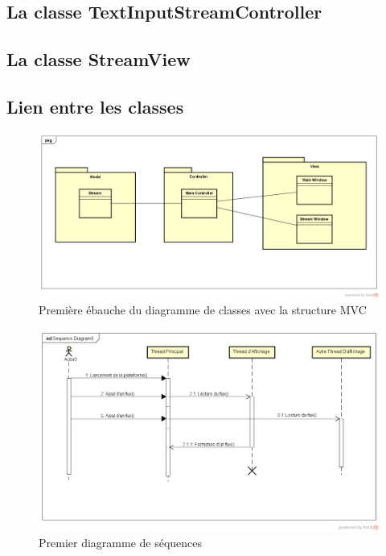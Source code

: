 \documentclass{polytech/polytech}
\begin{document}
\subsection{La classe TextInputStreamController}

\subsection{La classe StreamView}


\subsection{Lien entre les classes}

\begin{figure}
	\includegraphics[scale=0.25]{images/ClassDiagram.png}
	\caption{Première ébauche du diagramme de classes avec la structure MVC}
	\label{fig:classdiag1}
\end{figure}


\begin{figure}
	\includegraphics[scale=0.25]{images/SequenceDiagram.png}
	\caption{Premier diagramme de séquences}
	\label{fig:seqdiag1}
\end{figure}
\end{document}
